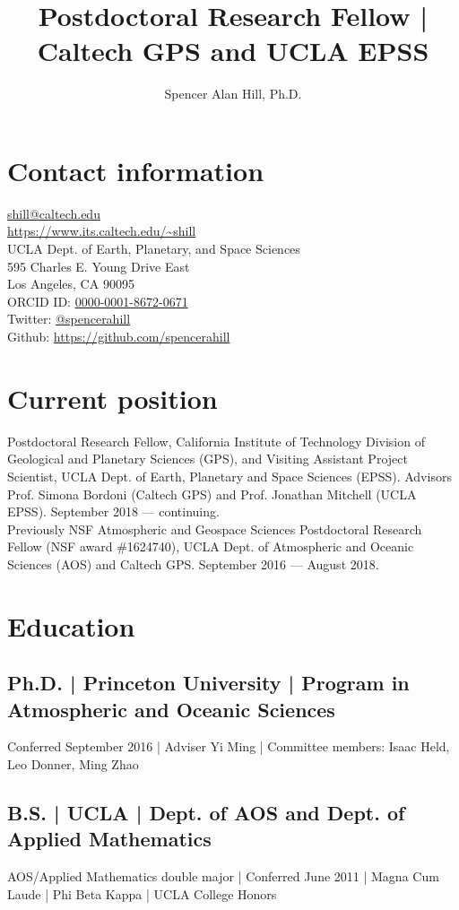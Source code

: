 \documentclass[12pt,letterpaper]{shillcv}
\author{Spencer Alan Hill, Ph.D.}
\date{}
\title{Postdoctoral Research Fellow | Caltech GPS and UCLA EPSS}
\begin{document}
\maketitle

\section*{Contact information}
\label{sec:orgd4fb411}
\href{mailto:shill@atmos.ucla.edu}{shill@caltech.edu}\\
\url{https://www.its.caltech.edu/\~shill}\\

UCLA Dept. of Earth, Planetary, and Space Sciences\\
595 Charles E. Young Drive East\\
Los Angeles, CA 90095\\

ORCID ID: \href{http://orcid.org/0000-0001-8672-0671}{0000-0001-8672-0671}\\
Twitter: \href{https://twitter.com/spencerahill}{@spencerahill}\\
Github: \url{https://github.com/spencerahill}
\section*{Current position}
\label{sec:orge62db6b}
Postdoctoral Research Fellow, California Institute of Technology Division of
Geological and Planetary Sciences (GPS), and Visiting Assistant Project
Scientist, UCLA Dept. of Earth, Planetary and Space Sciences (EPSS).
Advisors Prof. Simona Bordoni (Caltech GPS) and Prof. Jonathan Mitchell
(UCLA EPSS).  September 2018 --- continuing.\\

Previously NSF Atmospheric and Geospace Sciences Postdoctoral Research Fellow
(NSF award \#1624740), UCLA Dept. of Atmospheric and Oceanic Sciences (AOS) and
Caltech GPS.  September 2016 --- August 2018.
\section*{Education}
\label{sec:org3abd4ad}
\subsection*{Ph.D. | Princeton University | Program in Atmospheric and Oceanic Sciences}
\label{sec:org906e7b5}
Conferred September 2016 | Adviser Yi Ming | Committee members: Isaac
Held, Leo Donner, Ming Zhao
\subsection*{B.S. | UCLA | Dept. of AOS and Dept. of Applied Mathematics}
\label{sec:org950b53c}
AOS/Applied Mathematics double major | Conferred June 2011 |
Magna Cum Laude | Phi Beta Kappa | UCLA College Honors
\end{document}
